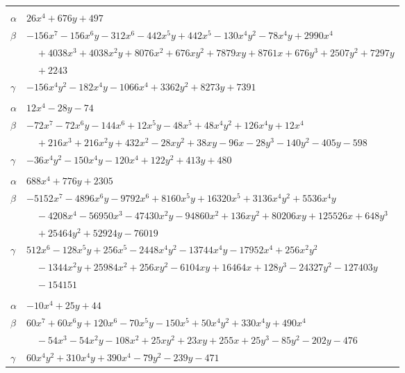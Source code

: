 \documentclass[11pt]{article}
\begin{document}
\begin{longtable}{@{}ll@{}}
\addlinespace[3pt]
\multicolumn{2}{@{}l}{$\{i,j\}=\{5,52\}$, $k_{ij}=2\cdot 3^{5}\cdot 7$}\\
$\alpha$ & $26x^{4}+676y+497$\\
$\beta$ & $-156x^{7}-156x^{6}y-312x^{6}-442x^{5}y+442x^{5}-130x^{4}y^{2}-78x^{4}y+2990x^{4}$\\
 & $\quad +4038x^{3}+4038x^{2}y+8076x^{2}+676xy^{2}+7879xy+8761x+676y^{3}+2507y^{2}+7297y$\\
 & $\quad +2243$\\
$\gamma$ & $-156x^{4}y^{2}-182x^{4}y-1066x^{4}+3362y^{2}+8273y+7391$\\
\addlinespace[3pt]
\multicolumn{2}{@{}l}{$\{i,j\}=\{5,60\}$, $k_{ij}=2\cdot 3^{4}$}\\
$\alpha$ & $12x^{4}-28y-74$\\
$\beta$ & $-72x^{7}-72x^{6}y-144x^{6}+12x^{5}y-48x^{5}+48x^{4}y^{2}+126x^{4}y+12x^{4}$\\
 & $\quad +216x^{3}+216x^{2}y+432x^{2}-28xy^{2}+38xy-96x-28y^{3}-140y^{2}-405y-598$\\
$\gamma$ & $-36x^{4}y^{2}-150x^{4}y-120x^{4}+122y^{2}+413y+480$\\
\addlinespace[3pt]
\multicolumn{2}{@{}l}{$\{i,j\}=\{5,62\}$, $k_{ij}=2^{6}\cdot 3$}\\
$\alpha$ & $688x^{4}+776y+2305$\\
$\beta$ & $-5152x^{7}-4896x^{6}y-9792x^{6}+8160x^{5}y+16320x^{5}+3136x^{4}y^{2}+5536x^{4}y$\\
 & $\quad -4208x^{4}-56950x^{3}-47430x^{2}y-94860x^{2}+136xy^{2}+80206xy+125526x+648y^{3}$\\
 & $\quad +25464y^{2}+52924y-76019$\\
$\gamma$ & $512x^{6}-128x^{5}y+256x^{5}-2448x^{4}y^{2}-13744x^{4}y-17952x^{4}+256x^{2}y^{2}$\\
 & $\quad -1344x^{2}y+25984x^{2}+256xy^{2}-6104xy+16464x+128y^{3}-24327y^{2}-127403y$\\
 & $\quad -154151$\\
\addlinespace[3pt]
\multicolumn{2}{@{}l}{$\{i,j\}=\{5,68\}$, $k_{ij}=2\cdot 3^{3}$}\\
$\alpha$ & $-10x^{4}+25y+44$\\
$\beta$ & $60x^{7}+60x^{6}y+120x^{6}-70x^{5}y-150x^{5}+50x^{4}y^{2}+330x^{4}y+490x^{4}$\\
 & $\quad -54x^{3}-54x^{2}y-108x^{2}+25xy^{2}+23xy+255x+25y^{3}-85y^{2}-202y-476$\\
$\gamma$ & $60x^{4}y^{2}+310x^{4}y+390x^{4}-79y^{2}-239y-471$\\

\end{longtable}
\end{document}
